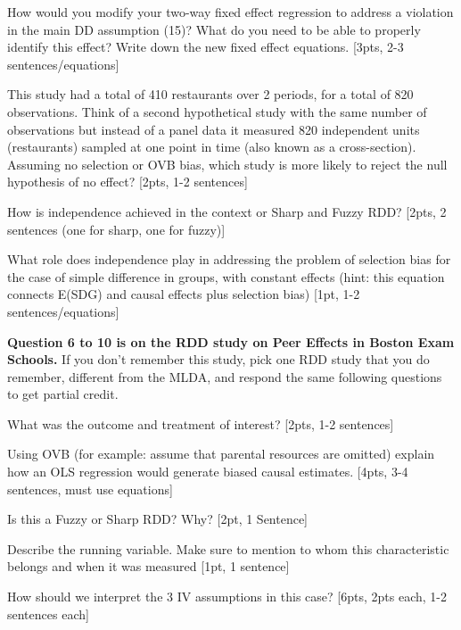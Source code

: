 \clearpage

\item How would you modify your two-way fixed effect regression to address a violation in the main DD assumption (15)? What do you need to be able to properly identify this effect? Write down the new fixed effect equations. [3pts, 2-3 sentences/equations]
\vspace{4cm}

\item This study had a total of 410 restaurants over 2 periods, for a total of 820 observations. Think of a second hypothetical study with the same number of observations but instead of a panel data it measured 820 independent units (restaurants) sampled at one point in time (also known as a cross-section). Assuming no selection or OVB bias, which study is more likely to reject the null hypothesis of no effect? [2pts, 1-2 sentences] 
\vspace{4cm}


\item How is independence achieved in the context or Sharp and Fuzzy RDD? [2pts, 2
sentences (one for sharp, one for fuzzy)]
\vspace{4cm}

\item What role does independence play in addressing the problem of selection bias for the case of simple difference in groups, with constant effects (hint: this equation connects E(SDG) and causal effects plus selection bias) [1pt, 1-2 sentences/equations]
\vspace{3cm}



\textbf{Question 6 to 10 is on the RDD study on Peer Effects in Boston Exam Schools.} If you don’t remember this study, pick one RDD study that you do remember, different from the MLDA, and respond the same following questions to get partial credit.
\item What was the outcome and treatment of interest? [2pts, 1-2 sentences]

\item Using OVB (for example: assume that parental resources are omitted) explain how an OLS regression would generate biased causal estimates. [4pts, 3-4 sentences, must use equations]

\vspace{4cm}
\item Is this a Fuzzy or Sharp RDD? Why? [2pt, 1 Sentence]
\vspace{4cm}
\item Describe the running variable. Make sure to mention to whom this characteristic belongs and when it was measured [1pt, 1 sentence]
\vspace{2cm}
\item How should we interpret the 3 IV assumptions in this case? [6pts, 2pts each, 1-2 sentences each]
\vspace{6cm}


